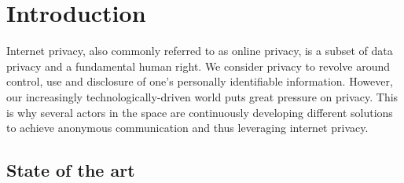 
\begin{abstract}

\end{abstract}
\section{Introduction}
Internet privacy, also commonly referred to as online privacy, is a subset of data privacy and a fundamental human right. We consider privacy to revolve around control, use and disclosure of one’s personally identifiable information.
However, our increasingly technologically-driven world puts great pressure on privacy.
This is why several actors in the space are continuously developing different solutions to achieve anonymous communication and thus leveraging internet privacy.


\subsection{State of the art}
